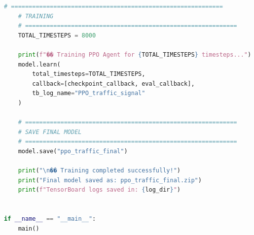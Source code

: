 ﻿\documentclass[11pt, a4paper]{report}
\begin{document}
\begin{lstlisting}[language=Python, caption={PPO Testing Script, Tsotlhe N. Seiphepi (ID: 21001137)}]
    # ============================================================
    # TRAINING
    # ============================================================
    TOTAL_TIMESTEPS = 8000

    print(f"�� Training PPO Agent for {TOTAL_TIMESTEPS} timesteps...")
    model.learn(
        total_timesteps=TOTAL_TIMESTEPS,
        callback=[checkpoint_callback, eval_callback],
        tb_log_name="PPO_traffic_signal"
    )

    # ============================================================
    # SAVE FINAL MODEL
    # ============================================================
    model.save("ppo_traffic_final")

    print("\n�� Training completed successfully!")
    print("Final model saved as: ppo_traffic_final.zip")
    print(f"TensorBoard logs saved in: {log_dir}")


if __name__ == "__main__":
    main()

\end{lstlisting}
\begin{lstlisting}
\end{lstlisting}


\begin{lstlisting}
\end{lstlisting}



\begin{lstlisting}
\end{lstlisting}
\end{document}
